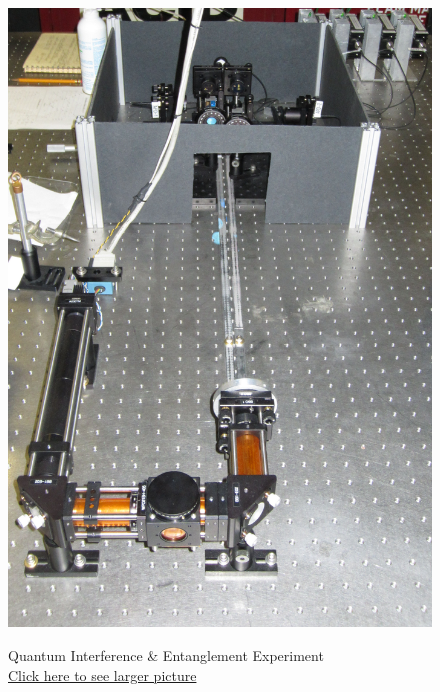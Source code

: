 \documentclass{../lab}
\begin{document}
\noindent
\begin{figure}[H]
\captionsetup{justification=centering}
  \href{http://experimentationlab.berkeley.edu/sites/default/files/images/QIE_0613_Crop_.jpg}{\includegraphics[width=\linewidth,keepaspectratio]{images/QIE_0613_Crop_.jpg}}
  \caption{Quantum Interference \& Entanglement Experiment \\ \href{http://experimentationlab.berkeley.edu/sites/default/files/images/QIE_0613_Crop_.jpg}{Click here to see larger picture}}
  \label{fig:QIE_0613_Crop_.jpg}
\endminipage\hfill
{}

\end{figure}
\end{document}
